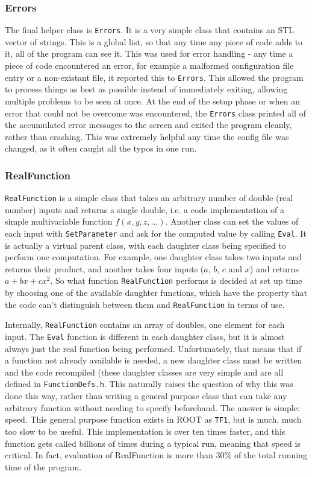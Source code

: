 \subsubsection{Errors}
The final helper class is {\tt Errors}.  It is a very simple class
that contains an STL vector of strings.  This is a global list, so
that any time any piece of code adds to it, all of the program can see
it.  This was used for error handling - any time a piece of code
encountered an error, for example a malformed configuration file entry
or a non-existant file, it reported this to {\tt Errors}.  This
allowed the program to process things as best as possible instead of
immediately exiting, allowing multiple problems to be seen at once.
At the end of the setup phase or when an error that could not be
overcome was encountered, the {\tt Errors} class printed all of the
accumulated error messages to the screen and exited the program
cleanly, rather than crashing.  This was extremely helpful any time
the config file was changed, as it often caught all the typos in one
run.

\subsubsection{RealFunction}
{\tt RealFunction} is a simple class that takes an arbitrary number of
double (real number) inputs and returns a single double, i.e. a code
implementation of a simple multivariable function $f(x,y,z,...)$.
Another class can set the values of each input with {\tt SetParameter}
and ask for the computed value by calling {\tt Eval}.  It is actually
a virtual parent class, with each daughter class being specified to
perform one computation.  For example, one daughter class takes two
inputs and returns their product, and another takes four inputs ($a$,
$b$, $c$ and $x$) and returns $a + b x + c x^2$.  So what function
{\tt RealFunction} performs is decided at set up time by choosing one
of the available daughter functions, which have the property that the
code can't distinguish between them and {\tt RealFunction} in terms of
use.

Internally, {\tt RealFunction} contains an array of doubles, one
element for each input.  The {\tt Eval} function is different in each
daughter class, but it is almost always just the real function being
performed.  Unfortunately, that means that if a function not already
available is needed, a new daughter class must be written and the code
recompiled (these daughter classes are very simple and are all defined
in {\tt FunctionDefs.h}.  This naturally raises the question of why
this was done this way, rather than writing a general purpose class
that can take any arbitrary function without needing to specify
beforehand.  The answer is simple: speed.  This general purpose
function exists in ROOT as {\tt TF1}, but is much, much too slow to be
useful.  This implementation is over ten times faster, and this
function gets called billions of times during a typical run, meaning
that speed is critical.  In fact, evaluation of RealFunction is more
than 30\% of the total running time of the program.

